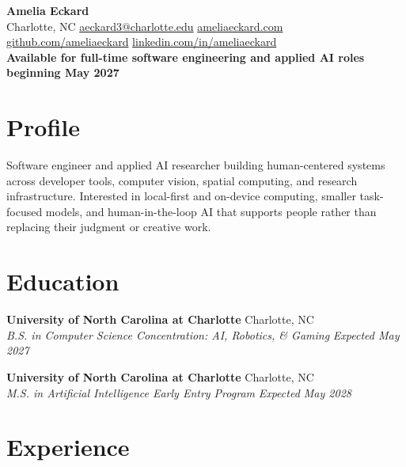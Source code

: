 \documentclass[letterpaper,10pt]{article}
\newcommand{\resumeentry}[4]{
  \noindent\textbf{#1} \hfill #2 \\
  \textit{#3} \hfill \textit{#4}
}
\begin{document}

\begin{center}
  {\Large\textbf{Amelia Eckard}} \\[3pt]
  Charlotte, NC \textbar{}
  \href{mailto:aeckard3@charlotte.edu}{aeckard3@charlotte.edu} \textbar{}
  \href{https://ameliaeckard.com}{ameliaeckard.com} \textbar{}
  \href{https://github.com/ameliaeckard}{github.com/ameliaeckard} \textbar{}
  \href{https://linkedin.com/in/ameliaeckard}{linkedin.com/in/ameliaeckard} \\[2pt]
  \textbf{Available for full-time software engineering and applied AI roles beginning May 2027}
\end{center}

\section{Profile}

Software engineer and applied AI researcher building human-centered systems across developer tools, computer vision, spatial computing, and research infrastructure. Interested in local-first and on-device computing, smaller task-focused models, and human-in-the-loop AI that supports people rather than replacing their judgment or creative work.

\section{Education}

\resumeentry
  {University of North Carolina at Charlotte}{Charlotte, NC}
  {B.S. in Computer Science \textbar{} Concentration: AI, Robotics, \& Gaming}{Expected May 2027}

\smallskip

\resumeentry
  {University of North Carolina at Charlotte}{Charlotte, NC}
  {M.S. in Artificial Intelligence \textbar{} Early Entry Program}{Expected May 2028}


\section{Experience}
\end{document}
